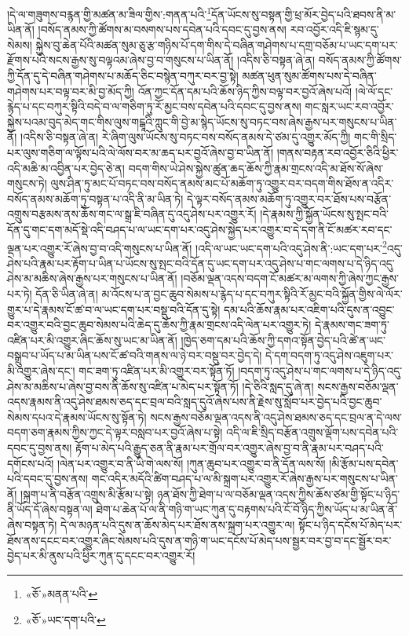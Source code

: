 །དེ་ལ་གཟུགས་བརྙན་གྱི་མཚན་མ་ཟིལ་གྱིས་:གནན་པའི་\footnote{«ཅོ་»མནན་པའི་}དོན་ཡོངས་སུ་བསྟན་གྱི་ཕྲ་མོར་བྱེད་པའི་ཐབས་ནི་མ་ཡིན་ནོ། །བསོད་ནམས་ཀྱི་ཚོགས་མ་བསགས་པས་དབེན་པའི་དབང་དུ་བྱས་ནས། རབ་འབྱོར་འདི་ཇི་སྙམ་དུ་སེམས། སྐྱེས་བུ་ཆེན་པོའི་མཚན་སུམ་ཅུ་རྩ་གཉིས་པོ་དག་གིས་དེ་བཞིན་གཤེགས་པ་དགྲ་བཅོམ་པ་ཡང་དག་པར་རྫོགས་པའི་སངས་རྒྱས་སུ་བལྟའམ་ཞེས་བྱ་བ་གསུངས་པ་ཡིན་ནོ། །འདིས་ཅི་བསྟན་ཞེ་ན། བསོད་ནམས་ཀྱི་ཚོགས་ཀྱི་དོན་དུ་དེ་བཞིན་གཤེགས་པ་མཆོད་ཅིང་བསྙེན་བཀུར་བར་བྱ་སྟེ། མཚན་ཕུན་སུམ་ཚོགས་པས་དེ་བཞིན་གཤེགས་པར་བལྟ་བར་མི་བྱ་མོད་ཀྱི། འོན་ཀྱང་དོན་དམ་པའི་ཆོས་ཉིད་ཀྱིས་བལྟ་བར་བྱའོ་ཞེས་པའོ། །ལེ་ལོ་དང་རྙེད་པ་དང་བཀུར་སྟིའི་བདེ་བ་ལ་གཅིག་ཏུ་རོ་མྱང་བས་དབེན་པའི་དབང་དུ་བྱས་ནས། གང་སླར་ཡང་རབ་འབྱོར་སྐྱེས་པའམ་བུད་མེད་གང་གིས་ལུས་གངྒཱའི་ཀླུང་གི་བྱེ་མ་སྙེད་ཡོངས་སུ་བཏང་བས་ཞེས་རྒྱས་པར་གསུངས་པ་ཡིན་ནོ། །འདིས་ཅི་བསྟན་ཞེ་ན། རེ་ཞིག་ལུས་ཡོངས་སུ་བཏང་བས་བསོད་ནམས་དེ་ཙམ་དུ་འགྱུར་མོད་ཀྱི། གང་གི་སྲིད་པར་ལུས་གཅིག་ལ་ལྟོས་པའི་ལེ་ལོས་བར་མ་ཆད་པར་བྱའོ་ཞེས་བྱ་བ་ཡིན་ནོ། །གནས་བརྟན་རབ་འབྱོར་ཅིའི་ཕྱིར་འདི་མཆི་མ་འབྱིན་པར་བྱེད་ཅེ་ན། བདག་གིས་ཡེ་ཤེས་སྐྱེས་ཚུན་ཆད་ཆོས་ཀྱི་རྣམ་གྲངས་འདི་མ་ཐོས་སོ་ཞེས་གསུངས་ཏེ། ལུས་ཤིན་ཏུ་མང་པོ་བཏང་བས་བསོད་ནམས་མང་པོ་མཆོག་ཏུ་འགྱུར་བར་བདག་གིས་ཐོས་ན་འདིར་བསོད་ནམས་མཆོག་ཏུ་བསྟན་པ་འདི་ནི་མ་ཡིན་ཏེ། དེ་ལྟར་བསོད་ནམས་མཆོག་ཏུ་འགྱུར་བར་ཐོས་པས་བརྩོན་འགྲུས་བརྩམས་ནས་ཆོས་གང་ལ་སྒྲ་ཇི་བཞིན་དུ་འདུ་ཤེས་པར་འགྱུར་རོ། །དེ་རྣམས་ཀྱི་སྐྱོན་ཡོངས་སུ་སྤང་བའི་དོན་དུ་གང་དག་མདོ་སྡེ་འདི་བཤད་པ་ལ་ཡང་དག་པར་འདུ་ཤེས་སྐྱེད་པར་འགྱུར་བ་དེ་དག་ནི་ངོ་མཚར་རབ་དང་ལྡན་པར་འགྱུར་རོ་ཞེས་བྱ་བ་འདི་གསུངས་པ་ཡིན་ནོ། །འདི་ལ་ཡང་ཡང་དག་པའི་འདུ་ཤེས་ནི་:ཡང་དག་པར་\footnote{«ཅོ་»ཡང་དག་པའི་}འདུ་ཤེས་པའི་རྣམ་པར་རྟོག་པ་ཡིན་པ་ཡོངས་སུ་སྤང་བའི་དོན་དུ་ཡང་དག་པར་འདུ་ཤེས་པ་གང་ལགས་པ་དེ་ཉིད་འདུ་ཤེས་མ་མཆིས་ཞེས་རྒྱས་པར་གསུངས་པ་ཡིན་ནོ། །བཅོམ་ལྡན་འདས་བདག་ངོ་མཚར་མ་ལགས་ཀྱི་ཞེས་ཀྱང་རྒྱས་པར་ཏེ། དོན་ཅི་ཡིན་ཞེ་ན། མ་འོངས་པ་ན་བྱང་ཆུབ་སེམས་པ་རྙེད་པ་དང་བཀུར་སྟིའི་རོ་མྱང་བའི་སྐྱོན་གྱིས་ལེ་ལོར་གྱུར་པ་དེ་རྣམས་ངོ་ཚ་བ་ལ་ཡང་དག་པར་བསྡུ་བའི་དོན་དུ་སྟེ། དམ་པའི་ཆོས་རྣམ་པར་འཇིག་པའི་དུས་ན་འབྱུང་བར་འགྱུར་བའི་བྱང་ཆུབ་སེམས་པའི་ཆེད་དུ་ཆོས་ཀྱི་རྣམ་གྲངས་འདི་ལེན་པར་འགྱུར་ཏེ། དེ་རྣམས་གང་ཟག་ཏུ་འཛིན་པར་མི་འགྱུར་ཞིང་ཆོས་སུ་ཡང་མ་ཡིན་ནོ། །ཁྱེད་ཅག་དམ་པའི་ཆོས་ཀྱི་དགའ་སྟོན་བྱེད་པའི་ཚེ་ན་ཡང་བསྒྲུབ་པ་ཡོད་པ་མ་ཡིན་པས་ངོ་ཚ་བའི་གནས་ལ་ཉེ་བར་བསྡུ་བར་བྱེད་དེ། དེ་དག་བདག་ཏུ་འདུ་ཤེས་འཇུག་པར་མི་འགྱུར་ཞེས་དང་། གང་ཟག་ཏུ་འཛིན་པར་མི་འགྱུར་བར་སྟོན་ཏོ། །བདག་ཏུ་འདུ་ཤེས་པ་གང་ལགས་པ་དེ་ཉིད་འདུ་ཤེས་མ་མཆིས་པ་ཞེས་བྱ་བས་ནི་ཆོས་སུ་འཛིན་པ་མེད་པར་སྟོན་ཏོ། །དེ་ཅིའི་སླད་དུ་ཞེ་ན། སངས་རྒྱས་བཅོམ་ལྡན་འདས་རྣམས་ནི་འདུ་ཤེས་ཐམས་ཅད་དང་བྲལ་བའི་སླད་དུའོ་ཞེས་པས་ནི་རྗེས་སུ་སློབ་པར་བྱེད་པའི་བྱང་ཆུབ་སེམས་དཔའ་དེ་རྣམས་ཡོངས་སུ་སྟོན་ཏེ། སངས་རྒྱས་བཅོམ་ལྡན་འདས་ནི་འདུ་ཤེས་ཐམས་ཅད་དང་བྲལ་ན་དེ་ལས་བདག་ཅག་རྣམས་ཀྱིས་ཀྱང་དེ་ལྟར་བསླབ་པར་བྱའོ་ཞེས་པ་སྟེ། འདི་ལ་ཇི་སྲིད་བརྩོན་འགྲུས་ལྡོག་པས་དབེན་པའི་དབང་དུ་བྱས་ནས། རྟོག་པ་མེད་པའི་རྒྱུད་ཅན་ནི་རྣམ་པར་གྲོལ་བར་འགྱུར་ཞེས་བྱ་བ་ནི་རྣམ་པར་བཤད་པའི་དགོངས་པའོ། །ལེན་པར་འགྱུར་བ་ནི་ཡི་གེ་ལས་སོ། །ཀུན་ཆུབ་པར་འགྱུར་བ་ནི་དོན་ལས་སོ། །མི་རྩོམ་པས་དབེན་པའི་དབང་དུ་བྱས་ནས། གང་འདིར་མདོའི་ཚིག་བཤད་པ་ལ་མི་སྐྲག་པར་འགྱུར་རོ་ཞེས་རྒྱས་པར་གསུངས་པ་ཡིན་ནོ། །སྐྲག་པ་ནི་བརྩོན་འགྲུས་མི་རྩོམ་པ་སྟེ། ཉན་ཐོས་ཀྱི་ཐེག་པ་ལ་བཅོམ་ལྡན་འདས་ཀྱིས་ཆོས་ཙམ་གྱི་སྟོང་པ་ཉིད་ནི་ཡོད་དོ་ཞེས་བསྟན་ལ། ཐེག་པ་ཆེན་པོ་ལ་ནི་གཉི་ག་ཡང་ཀུན་དུ་བརྟགས་པའི་ངོ་བོ་ཉིད་ཀྱིས་ཡོད་པ་མ་ཡིན་ནོ་ཞེས་བསྟན་ཏེ། དེ་ལ་མཉན་པའི་དུས་ན་ཆོས་མེད་པར་ཐོས་ནས་སྐྲག་པར་འགྱུར་ལ། སྟོང་པ་ཉིད་དངོས་པོ་མེད་པར་ཐོས་ནས་དངང་བར་འགྱུར་ཞིང་སེམས་པའི་དུས་ན་གཉི་ག་ཡང་དངོས་པོ་མེད་པས་སྦྱར་བར་བྱ་བ་དང་སྦྱོར་བར་བྱེད་པར་མི་ནུས་པའི་ཕྱིར་ཀུན་དུ་དངང་བར་འགྱུར་རོ། 